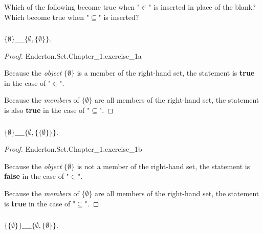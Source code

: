 \documentclass{report}
\begin{document}
Which of the following become true when "$\in$" is inserted in place of the
  blank?
Which become true when "$\subseteq$" is inserted?

\subsubsection{}%
\label{ssub:baby-set-theory-1a}

$\{\emptyset\} \_\_\_\_ \{\emptyset, \{\emptyset\}\}$.

\begin{proof}

    {Enderton.Set.Chapter\_1.exercise\_1a}

  Because the \textit{object} $\{\emptyset\}$ is a member of the right-hand set,
    the statement is \textbf{true} in the case of "$\in$".

  Because the \textit{members} of $\{\emptyset\}$ are all members of the
    right-hand set, the statement is also \textbf{true} in the case of
    "$\subseteq$".

\end{proof}

\subsubsection{}%
\label{ssub:baby-set-theory-1b}

$\{\emptyset\} \_\_\_\_ \{\emptyset, \{\{\emptyset\}\}\}$.

\begin{proof}

    {Enderton.Set.Chapter\_1.exercise\_1b}

  Because the \textit{object} $\{\emptyset\}$ is not a member of the right-hand
    set, the statement is \textbf{false} in the case of "$\in$".

  Because the \textit{members} of $\{\emptyset\}$ are all members of the
    right-hand set, the statement is \textbf{true} in the case of "$\subseteq$".

\end{proof}

\subsubsection{}%
\label{ssub:baby-set-theory-1c}

$\{\{\emptyset\}\} \_\_\_\_ \{\emptyset, \{\emptyset\}\}$.
\end{document}
